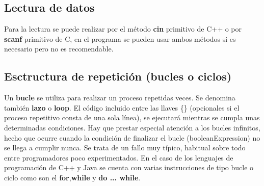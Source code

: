 \subsection{Lectura de datos}

Para la lectura  se puede realizar por el método \textbf{cin} primitivo
de C++ o por \textbf{scanf} primitivo de C, en el programa se pueden usar ambos métodos si es necesario pero no es recomendable.

\subsection{Esctructura de repetición (bucles o ciclos)}

Un \textbf{bucle} se utiliza para realizar un proceso repetidas veces. Se denomina también \textbf{lazo} o \textbf{loop}. El
código incluido entre las llaves \{\} (opcionales si el proceso repetitivo consta de una sola línea), se
ejecutará mientras se cumpla unas determinadas condiciones. Hay que prestar especial atención a
los bucles infinitos, hecho que ocurre cuando la condición de finalizar el bucle
(booleanExpression) no se llega a cumplir nunca. Se trata de un fallo muy típico, habitual sobre
todo entre programadores poco experimentados. En el caso de los lenguajes de programación de C++ y Java se cuenta con varias instrucciones de tipo bucle o ciclo como son el \textbf{for},\textbf{while} y \textbf{do ... while}.